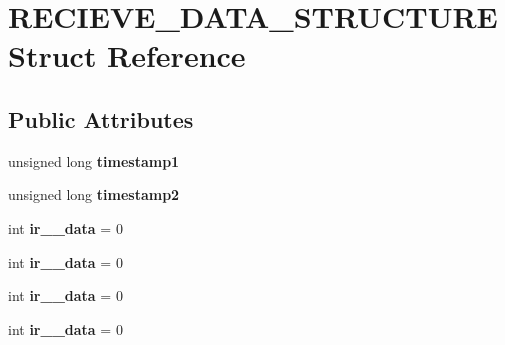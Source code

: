 \hypertarget{struct_r_e_c_i_e_v_e___d_a_t_a___s_t_r_u_c_t_u_r_e}{}\section{R\+E\+C\+I\+E\+V\+E\+\_\+\+D\+A\+T\+A\+\_\+\+S\+T\+R\+U\+C\+T\+U\+RE Struct Reference}
\label{struct_r_e_c_i_e_v_e___d_a_t_a___s_t_r_u_c_t_u_r_e}
\subsection*{Public Attributes}
\begin{DoxyCompactItemize}
\item 
unsigned long {\bfseries timestamp1}\hypertarget{struct_r_e_c_i_e_v_e___d_a_t_a___s_t_r_u_c_t_u_r_e_a55d09ebf5b034d4d197546a7a0294abb}{}\label{struct_r_e_c_i_e_v_e___d_a_t_a___s_t_r_u_c_t_u_r_e_a55d09ebf5b034d4d197546a7a0294abb}

\item 
unsigned long {\bfseries timestamp2}\hypertarget{struct_r_e_c_i_e_v_e___d_a_t_a___s_t_r_u_c_t_u_r_e_adfbab4bee916f32ebe38a934e0f0e875}{}\label{struct_r_e_c_i_e_v_e___d_a_t_a___s_t_r_u_c_t_u_r_e_adfbab4bee916f32ebe38a934e0f0e875}

\item 
int {\bfseries ir\+\_\+\_\+data} = 0\hypertarget{struct_r_e_c_i_e_v_e___d_a_t_a___s_t_r_u_c_t_u_r_e_a48d33ddd33d317a3c884fd46ab5728ef}{}\label{struct_r_e_c_i_e_v_e___d_a_t_a___s_t_r_u_c_t_u_r_e_a48d33ddd33d317a3c884fd46ab5728ef}

\item 
int {\bfseries ir\+\_\+\_\+data} = 0\hypertarget{struct_r_e_c_i_e_v_e___d_a_t_a___s_t_r_u_c_t_u_r_e_a36af77c0244987100ea09db2302b83be}{}\label{struct_r_e_c_i_e_v_e___d_a_t_a___s_t_r_u_c_t_u_r_e_a36af77c0244987100ea09db2302b83be}

\item 
int {\bfseries ir\+\_\+\_\+data} = 0\hypertarget{struct_r_e_c_i_e_v_e___d_a_t_a___s_t_r_u_c_t_u_r_e_ab9c71c15e138e15b2f4351a41bccd2b9}{}\label{struct_r_e_c_i_e_v_e___d_a_t_a___s_t_r_u_c_t_u_r_e_ab9c71c15e138e15b2f4351a41bccd2b9}

\item 
int {\bfseries ir\+\_\+\_\+data} = 0\hypertarget{struct_r_e_c_i_e_v_e___d_a_t_a___s_t_r_u_c_t_u_r_e_a6dd2d212efaf5be01d48d919f81bd524}{}\label{struct_r_e_c_i_e_v_e___d_a_t_a___s_t_r_u_c_t_u_r_e_a6dd2d212efaf5be01d48d919f81bd524}


\end{DoxyCompactItemize}

